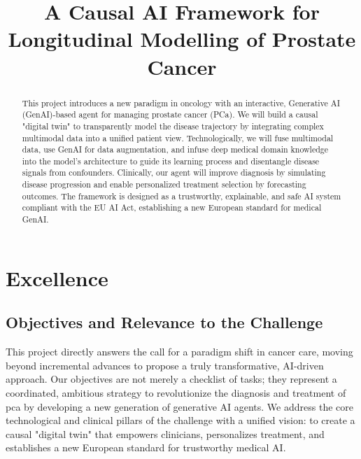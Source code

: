\documentclass[11pt, a4paper]{article}
\title{A Causal AI Framework for Longitudinal Modelling of Prostate Cancer}
\author{}
\date{}
\begin{document}
\maketitle

\begin{abstract}
This project introduces a new paradigm in oncology with an interactive, Generative AI (GenAI)-based agent for managing prostate cancer (PCa). We will build a causal "digital twin" to transparently model the disease trajectory by integrating complex multimodal data into a unified patient view. Technologically, we will fuse multimodal data, use GenAI for data augmentation, and infuse deep medical domain knowledge into the model's architecture to guide its learning process and disentangle disease signals from confounders. Clinically, our agent will improve diagnosis by simulating disease progression and enable personalized treatment selection by forecasting outcomes. The framework is designed as a trustworthy, explainable, and safe AI system compliant with the EU AI Act, establishing a new European standard for medical GenAI.
\end{abstract}

\section{Excellence}

\subsection{Objectives and Relevance to the Challenge}
This project directly answers the call for a paradigm shift in cancer care, moving beyond incremental advances to propose a truly transformative, AI-driven approach. Our objectives are not merely a checklist of tasks; they represent a coordinated, ambitious strategy to revolutionize the diagnosis and treatment of \gls{pca} by developing a new generation of generative AI agents. We address the core technological and clinical pillars of the challenge with a unified vision: to create a causal "digital twin" that empowers clinicians, personalizes treatment, and establishes a new European standard for trustworthy medical AI.
\end{document}
